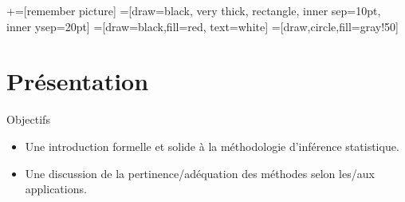 \usetikzlibrary{positioning}
\usetikzlibrary{snakes}
\usetikzlibrary{calc}
\usetikzlibrary{arrows}
\usetikzlibrary{decorations.markings}
\usetikzlibrary{shapes.misc}
\usetikzlibrary{matrix,shapes,arrows,fit,tikzmark}
\usetikzlibrary{shapes}
\newcommand\marktopleft[1]{%
    \tikz[overlay,remember picture] 
        \node (marker-#1-a) at (-.3em,.3em) {};%
}
\newcommand\markbottomright[2]{%
    \tikz[overlay,remember picture] 
        \node (marker-#1-b) at (0em,0em) {};%
}
+=[remember picture] 
 =[draw=black, very thick, rectangle, inner sep=10pt, inner ysep=20pt]
 =[draw=black,fill=red, text=white]
=[draw,circle,fill=gray!50]



\begin{frame}
\titlepage
\end{frame}
\begin{frame}
 \tableofcontents
    \end{frame}


\section{Présentation}
\frame{\sectionpage}

\begin{frame}[allowframebreaks]{Objectifs}
\begin{itemize}
    \item Une introduction formelle et solide à la méthodologie d'inférence statistique.
    \item Une discussion de la pertinence/adéquation des méthodes selon les/aux applications.
\end{itemize}
\end{frame}

